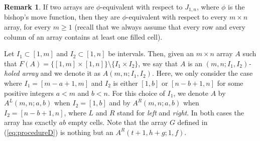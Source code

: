 \documentclass{amsart}
\theoremstyle{definition}
\newtheorem{rem}[prop]{Remark}
\numberwithin{equation}{section}
\begin{document}
\begin{rem}
If two arrays are $\phi$-equivalent with respect to $J_{1,n}$, where $\phi$ is the bishop's move function, then they are $\phi$-equivalent with respect to every $m \times n$ array, for every $m \geq 1$ (recall that we always assume that every row and every column of an array contains at least one filled cell).
\end{rem}

Let $I_1 \subset [1,m]$ and $I_2 \subset [1,n]$ be intervals. Then, given an $m \times n$ array $A$ such that $F(A) = \{[1,m] \times [1,n]\} \setminus\{ I_1\times I_2\}$, we say that $A$ is an \textit{$(m,n;I_1,I_2)$-holed array} and we denote it  as $A(m,n;I_1,I_2)$.  
Here, we only consider the case where $I_1 = [m-a+1,m]$ and $I_2$  is either $[1,b]$ or $[n-b+1,n]$ for some positive integers $a<m$ and $b<n$. For this choice of $I_1$, we denote $A$ by $A^{L}(m,n;a,b)$ when $I_2=[1,b]$ and by $A^{R}(m,n;a,b)$ when $I_2=[n-b+1,n]$, where $L$ and $R$ stand for \textit{left} and \textit{right}. In both cases the array has exactly $ab$ empty cells.
Note that the array $G$ defined in (\ref{eq:procedureD}) is nothing but an $A^{R}(t+1,h+ g;1,f)$.
\end{document}
